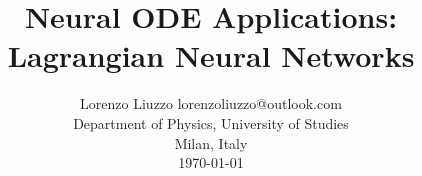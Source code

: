 \documentclass[twoside,11pt]{article}
\begin{document}
\title{
  Neural ODE Applications: \\ 
  Lagrangian Neural Networks
}

\author{
  \name Lorenzo Liuzzo 
  \email lorenzoliuzzo@outlook.com \\
  \addr Department of Physics, University of Studies \\ Milan, Italy \\
  \today
}

\maketitle

\begin{abstract}
  \lipsum[1]
\end{abstract}





\newpage


\newpage
\nocite{*}


\end{document}
